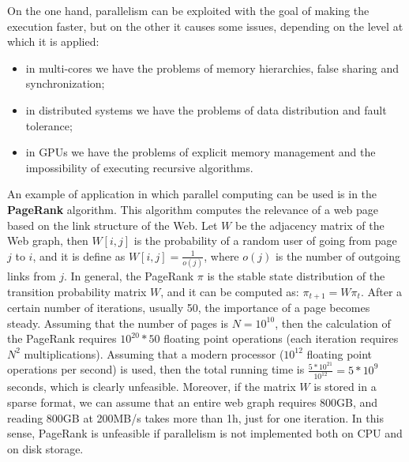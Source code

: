 On the one hand, parallelism can be exploited with the goal of making the execution faster, but on the other it causes some issues, depending on the level at which it is applied:

\begin{itemize}

    \item in multi-cores we have the problems of memory hierarchies, false sharing and synchronization;

    \item in distributed systems we have the problems of data distribution and fault tolerance;

    \item in GPUs we have the problems of explicit memory management and the impossibility of executing recursive algorithms.
    
\end{itemize}

An example of application in which parallel computing can be used is in the \textbf{PageRank} algorithm. This algorithm computes the relevance of a web page based on the link structure of the Web. Let $W$ be the adjacency matrix of the Web graph, then $W[i,j]$ is the probability of a random user of going from page $j$ to $i$, and it is define as $W[i,j] = \frac{1}{o(j)}$, where $o(j)$ is the number of outgoing links from $j$. In general, the PageRank $\pi$ is the stable state distribution of the transition probability matrix $W$, and it can be computed as: $\pi_{t+1} = W\pi_t$. After a certain number of iterations, usually 50, the importance of a page becomes steady. Assuming that the number of pages is $N = 10^{10}$, then the calculation of the PageRank requires $10^{20} * 50$ floating point operations (each iteration requires $N^2$ multiplications). Assuming that a modern processor ($10^{12}$ floating point operations per second) is used, then the total running time is $\frac{5 * 10^{21}}{10^{12}} = 5 * 10^9$ seconds, which is clearly unfeasible. Moreover, if the matrix $W$ is stored in a sparse format, we can assume that an entire web graph requires 800GB, and reading 800GB at 200MB/s takes more than 1h, just for one iteration. In this sense, PageRank is unfeasible if parallelism is not implemented both on CPU and on disk storage.
